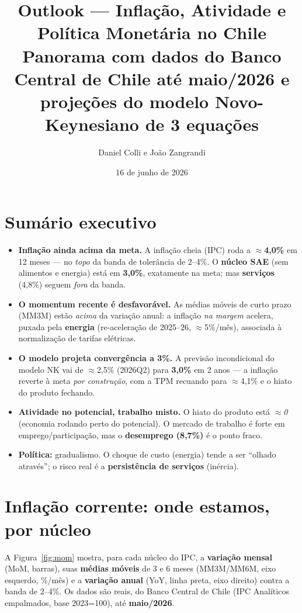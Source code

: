 \documentclass[11pt]{article}
\title{\textbf{\textcolor{accent}{Outlook --- Inflação, Atividade e Política
Monetária no Chile}}\\[2mm]
\large Panorama com dados do Banco Central de Chile até \textbf{maio/2026} e
projeções do modelo Novo-Keynesiano de 3 equações}
\author{Daniel Colli e João Zangrandi}
\date{16 de junho de 2026}
\begin{document}
\maketitle
\vspace{-4mm}

\section*{Sumário executivo}
\begin{itemize}[nosep]
  \item \textbf{Inflação ainda acima da meta.} A inflação cheia (IPC) roda a
  \textbf{$\approx$4,0\%} em 12 meses --- no \emph{topo} da banda de tolerância de
  2--4\%. O \textbf{núcleo SAE} (sem alimentos e energia) está em \textbf{3,0\%},
  exatamente na meta; mas \textbf{serviços} (4,8\%) seguem \emph{fora} da banda.
  \item \textbf{O momentum recente é desfavorável.} As médias móveis de curto prazo
  (MM3M) estão \emph{acima} da variação anual: a inflação \emph{na margem} acelera,
  puxada pela \textbf{energia} (re-aceleração de 2025--26, $\approx$5\%/mês),
  associada à normalização de tarifas elétricas.
  \item \textbf{O modelo projeta convergência a 3\%.} A previsão incondicional do
  modelo NK vai de $\approx$2,5\% (2026Q2) para \textbf{3,0\%} em 2 anos --- a
  inflação reverte à meta \emph{por construção}, com a TPM recuando para
  $\approx$4,1\% e o hiato do produto fechando.
  \item \textbf{Atividade no potencial, trabalho misto.} O hiato do produto está
  \emph{$\approx$0} (economia rodando perto do potencial). O mercado de trabalho é
  forte em emprego/participação, mas o \textbf{desemprego (8,7\%)} é o ponto fraco.
  \item \textbf{Política:} gradualismo. O choque de custo (energia) tende a ser
  ``olhado através''; o risco real é a \textbf{persistência de serviços} (inércia).
\end{itemize}

\section{Inflação corrente: onde estamos, por núcleo}
A Figura~\ref{fig:mom} mostra, para cada núcleo do IPC, a \textbf{variação mensal}
(MoM, barras), suas \textbf{médias móveis} de 3 e 6 meses (MM3M/MM6M, eixo esquerdo,
\%/mês) e a \textbf{variação anual} (YoY, linha preta, eixo direito) contra a banda
de 2--4\%. Os dados são reais, do Banco Central de Chile (IPC Analíticos empalmados,
base 2023=100), até \textbf{maio/2026}.
\end{document}
